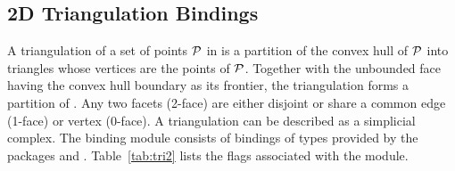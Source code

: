 \subsection{2D Triangulation Bindings}
\label{ssec:modules:tri2}
A triangulation of a set of points ${\cal P}$ in \Rtwo is a partition of
the convex hull of ${\cal P}$ into triangles whose vertices are the
points of ${\cal P}$. Together with the unbounded face having the convex
hull boundary as its frontier, the triangulation forms a partition of
\Rtwo. Any two facets (2-face) are either disjoint or share a common
edge (1-face) or vertex (0-face). A triangulation can be described as
a simplicial complex. The binding module
\iiDTriangulationsPackage{} consists of bindings of types provided by
the \cgal{} packages \iiDTriangulationsPackage{} and
\iiDPeriodicTriangulationsPackage{}. Table~\ref{tab:tri2} lists the
\cmake{} flags associated with the \iiDTriangulationsPackage{}
module.

\begin{table}[!htp]
  \caption{\iiDTriangulationsPackage{} module flags.}
  \centering{}
  \label{tab:tri2}
\end{table}

